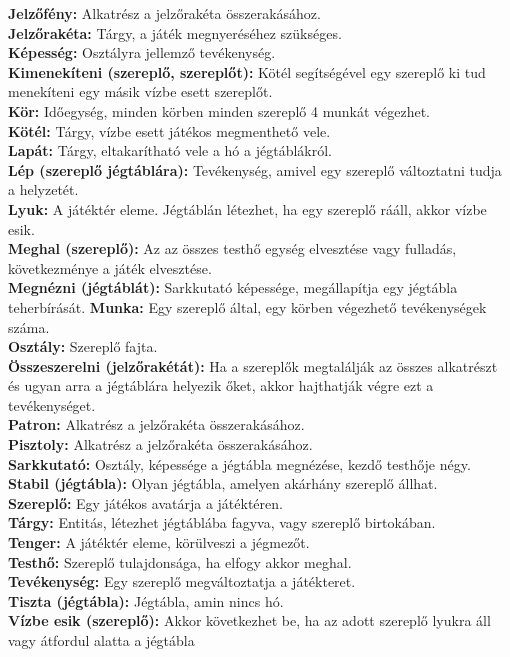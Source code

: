 \textbf{Jelzőfény:} Alkatrész a jelzőrakéta összerakásához. \\
\textbf{Jelzőrakéta:} Tárgy, a játék megnyeréséhez szükséges. \\
\textbf{Képesség:} Osztályra jellemző tevékenység. \\
\textbf{Kimenekíteni (szereplő, szereplőt):} Kötél segítségével egy szereplő ki tud menekíteni egy másik vízbe esett szereplőt. \\
\textbf{Kör:} Időegység, minden körben minden szereplő 4 munkát végezhet. \\
\textbf{Kötél:} Tárgy, vízbe esett játékos megmenthető vele. \\
\textbf{Lapát:} Tárgy, eltakarítható vele a hó a jégtáblákról. \\
\textbf{Lép (szereplő jégtáblára):} Tevékenység, amivel egy szereplő változtatni tudja a helyzetét. \\
\textbf{Lyuk:} A játéktér eleme. Jégtáblán létezhet, ha egy szereplő rááll, akkor vízbe esik. \\
\textbf{Meghal (szereplő):} Az az összes testhő egység elvesztése vagy fulladás, következménye a játék elvesztése. \\
\textbf{Megnézni (jégtáblát):} Sarkkutató képessége, megállapítja egy jégtábla teherbírását.
\textbf{Munka:} Egy szereplő által, egy körben végezhető tevékenységek száma. \\
\textbf{Osztály:} Szereplő fajta. \\
\textbf{Összeszerelni (jelzőrakétát):} Ha a szereplők megtalálják az összes alkatrészt és ugyan arra a jégtáblára helyezik őket, akkor hajthatják végre ezt a tevékenységet. \\
\textbf{Patron:} Alkatrész a jelzőrakéta összerakásához. \\
\textbf{Pisztoly:} Alkatrész  a jelzőrakéta összerakásához.\\
\textbf{Sarkkutató:} Osztály, képessége a jégtábla megnézése, kezdő testhője négy. \\
\textbf{Stabil (jégtábla):} Olyan jégtábla, amelyen akárhány szereplő állhat. \\
\textbf{Szereplő:} Egy játékos avatárja a játéktéren. \\
\textbf{Tárgy:} Entitás, létezhet jégtáblába fagyva, vagy szereplő birtokában. \\
\textbf{Tenger:} A játéktér eleme, körülveszi a jégmezőt. \\
\textbf{Testhő:} Szereplő tulajdonsága, ha elfogy akkor meghal. \\
\textbf{Tevékenység:} Egy szereplő megváltoztatja a játékteret. \\
\textbf{Tiszta (jégtábla):} Jégtábla, amin nincs hó. \\
\textbf{Vízbe esik (szereplő):} Akkor következhet be, ha az adott szereplő lyukra áll vagy átfordul alatta a jégtábla \\
\newpage


